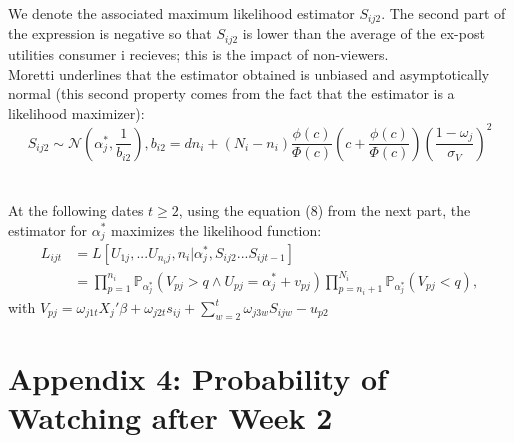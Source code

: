 We denote the associated maximum likelihood estimator $S_{i j 2}$. The second part of the expression is negative so that $S_{i j 2}$ is lower than the average of the ex-post utilities consumer i recieves; this is the impact of non-viewers.\\

Moretti underlines that the estimator obtained is unbiased and asymptotically normal (this second property comes from the fact that the estimator is a likelihood maximizer): 
\begin{equation}
	S_{i j 2}\sim\mathcal{N}(\alpha_{j}^{*}, \frac{1}{b_{i 2}}) , b_{i 2}=dn_{i}+(N_{i}-n_{i})\frac{\phi(c)}{\Phi(c)}\left(c+\frac{\phi(c)}{\Phi(c)}\right)(\frac{1-\omega_{j}}{\sigma_{V}})^{2}
\end{equation}\\
\\
At the following dates $t\geqslant2$, using the equation (8) from the next part, the estimator for $\alpha_{j}^{*}$ maximizes the likelihood function:
\begin{align*}
	L_{i j t}&=L[U_{1 j},...U_{n_{i} j}, n_{i}|\alpha_{j}^{*},S_{i j 2}...S_{i j t-1}]\\
	&=\prod_{p=1}^{n_{i}}\mathbb{P}_{\alpha_{j}^{*}}(V_{p j}>q \wedge U_{p j}=\alpha_{j}^{*}+v_{p j})\prod_{p=n_{i}+1}^{N_{i}}\mathbb{P}_{\alpha_{j}^{*}}(V_{p j}<q),
\end{align*}
with $V_{p j}=\omega_{j 1 t}X_{j}'\beta +\omega_{j 2 t}s_{i j}+\sum_{w=2}^{t}\omega_{j 3 w}S_{i j w}-u_{p 2}$	

\section*{Appendix 4: Probability of Watching after Week 2}

